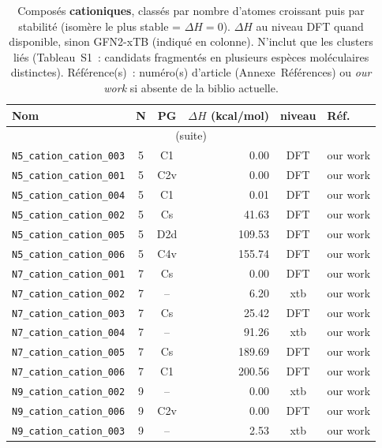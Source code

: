 {\scriptsize
\begin{longtable}{@{}p{4.7cm}ccrcp{1.6cm}@{}}
\caption{Compos\'es \textbf{cationiques}, class\'es par nombre d'atomes croissant puis par stabilit\'e (isom\`ere le plus stable = $\Delta H=0$). $\Delta H$ au niveau DFT quand disponible, sinon GFN2-xTB (indiqu\'e en colonne). N'inclut que les clusters li\'es (Tableau~S1~: candidats fragment\'es en plusieurs esp\`eces mol\'eculaires distinctes). R\'ef\'erence(s)~: num\'ero(s) d'article (Annexe~R\'ef\'erences) ou \emph{our work} si absente de la biblio actuelle.}
\label{tab:provenance-cation}\\
\toprule
\textbf{Nom} & \textbf{N} & \textbf{PG} & \textbf{$\Delta H$ (kcal/mol)} & \textbf{niveau} & \textbf{R\'ef.} \\
\midrule\endfirsthead
\multicolumn{6}{c}{\small (suite)}\\ \toprule\endhead
\bottomrule\endfoot
\bottomrule\endlastfoot
\addlinespace
\texttt{N5\_cation\_cation\_003} & 5 & C1 & 0.00 & DFT & our work \\
\texttt{N5\_cation\_cation\_001} & 5 & C2v & 0.00 & DFT & our work \\
\texttt{N5\_cation\_cation\_004} & 5 & C1 & 0.01 & DFT & our work \\
\texttt{N5\_cation\_cation\_002} & 5 & Cs & 41.63 & DFT & our work \\
\texttt{N5\_cation\_cation\_005} & 5 & D2d & 109.53 & DFT & our work \\
\texttt{N5\_cation\_cation\_006} & 5 & C4v & 155.74 & DFT & our work \\
\addlinespace
\texttt{N7\_cation\_cation\_001} & 7 & Cs & 0.00 & DFT & our work \\
\texttt{N7\_cation\_cation\_002} & 7 & -- & 6.20 & xtb & our work \\
\texttt{N7\_cation\_cation\_003} & 7 & Cs & 25.42 & DFT & our work \\
\texttt{N7\_cation\_cation\_004} & 7 & -- & 91.26 & xtb & our work \\
\texttt{N7\_cation\_cation\_005} & 7 & Cs & 189.69 & DFT & our work \\
\texttt{N7\_cation\_cation\_006} & 7 & C1 & 200.56 & DFT & our work \\
\addlinespace
\texttt{N9\_cation\_cation\_002} & 9 & -- & 0.00 & xtb & our work \\
\texttt{N9\_cation\_cation\_006} & 9 & C2v & 0.00 & DFT & our work \\
\texttt{N9\_cation\_cation\_003} & 9 & -- & 2.53 & xtb & our work \\

\end{longtable}}
